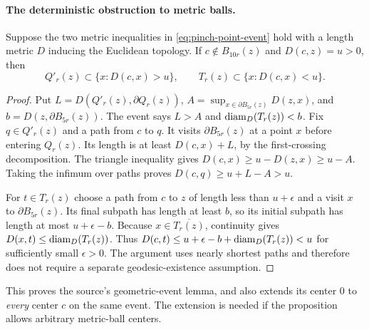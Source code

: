 \documentclass[12pt]{amsart}
\numberwithin{equation}{section}
\begin{document}
\paragraph{The deterministic obstruction to metric balls.}
\begin{lemma}\label{s11-pinch:lem:obstruction}
Suppose the two metric inequalities in \eqref{eq:pinch-point-event} hold
with a length metric $D$ inducing the Euclidean topology. If
$c\notin B_{10r}(z)$ and
$D(c,z)=u>0$, then
\[
       Q'_r(z)\subset\{x:D(c,x)>u\},\qquad
       T_r(z)\subset\{x:D(c,x)<u\}.
\]
\end{lemma}
\begin{proof}
Put
$L=D(Q'_r(z),\partial Q_r(z))$,
$A=\sup_{x\in\partial B_{5r}(z)}D(z,x)$, and
$b=D(z,\partial B_{5r}(z))$.
The event says $L>A$ and ${\mbox{diam}}_D(T_r(z))<b$.
Fix $q\in Q'_r(z)$ and a path from $c$ to $q$.
It visits $\partial B_{5r}(z)$ at a point $x$ before entering
$Q_r(z)$. Its length is at least $D(c,x)+L$, by the
first-crossing decomposition. The triangle inequality gives
$D(c,x)\ge u-D(z,x)\ge u-A$. Taking the infimum over
paths proves $D(c,q)\ge u+L-A>u$.

For $t\in T_r(z)$ choose a path from $c$ to $z$ of length
less than $u+\epsilon$ and a visit $x$ to
$\partial B_{5r}(z)$. Its final subpath has length at least
$b$, so its initial subpath has length at most
$u+\epsilon-b$. Because $x\in\overline{T_r(z)}$,
continuity gives
$D(x,t)\le{\mbox{diam}}_D(T_r(z))$.
Thus
$D(c,t)\le u+\epsilon-b+{\mbox{diam}}_D(T_r(z))<u$
for sufficiently small $\epsilon>0$.
The argument uses nearly shortest paths and therefore does
not require a separate geodesic-existence assumption.
\end{proof}
This proves the source's geometric-event lemma, and also
extends its center $0$ to \emph{every} center $c$ on the same
event. The extension is needed if the proposition allows
arbitrary metric-ball centers.
\end{document}

